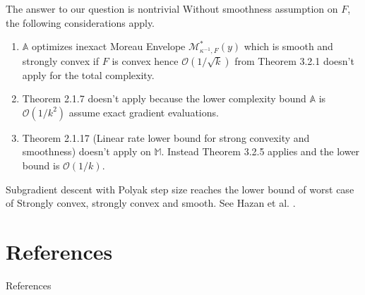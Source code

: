 \documentclass[11pt]{beamer}
\theoremstyle{definition}
\begin{document}
        \begin{frame}{The answer to our question is nontrivial}
            Without smoothness assumption on $F$, the following considerations apply. 
            \begin{enumerate}
                \item $\mathbb A$ optimizes inexact Moreau Envelope $\mathcal M^*_{\kappa^{-1}, F}(y)$ which is smooth and strongly convex if $F$ is convex hence $\mathcal O(1/\sqrt{k})$ from Theorem 3.2.1 \cite{nesterov_lectures_2018} doesn't apply for the total complexity.  
                \item Theorem 2.1.7 \cite{nesterov_lectures_2018} doesn't apply because the lower complexity bound $\mathbb A$ is $\mathcal O(1/k^2)$ assume exact gradient evaluations. 
                \item Theorem 2.1.17 \cite{nesterov_lectures_2018} (Linear rate lower bound for strong convexity and smoothness) doesn't apply on $\mathbb M$. 
                Instead Theorem 3.2.5 applies and the lower bound is $\mathcal O(1/k)$. 
            \end{enumerate}
            Subgradient descent with Polyak step size reaches the lower bound of worst case of Strongly convex, strongly convex and smooth.
            See Hazan et al. \cite{hazan_revisiting_2022}. 

        \end{frame}

\section{References}
    \begin{frame}[allowframebreaks]{References}
        
    \end{frame}
\end{document}
